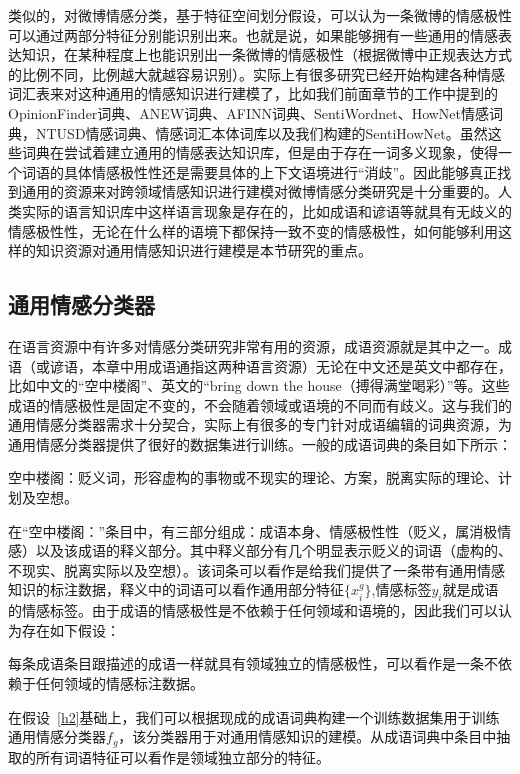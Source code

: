 类似的，对微博情感分类，基于特征空间划分假设，可以认为一条微博的情感极性可以通过两部分特征分别能识别出来。也就是说，如果能够拥有一些通用的情感表达知识，在某种程度上也能识别出一条微博的情感极性（根据微博中正规表达方式的比例不同，比例越大就越容易识别）。实际上有很多研究已经开始构建各种情感词汇表来对这种通用的情感知识进行建模了，比如我们前面章节的工作中提到的OpinionFinder词典、ANEW词典、AFINN词典、SentiWordnet、HowNet情感词典，NTUSD情感词典、情感词汇本体词库以及我们构建的SentiHowNet。虽然这些词典在尝试着建立通用的情感表达知识库，但是由于存在一词多义现象，使得一个词语的具体情感极性性还是需要具体的上下文语境进行“消歧”。因此能够真正找到通用的资源来对跨领域情感知识进行建模对微博情感分类研究是十分重要的。人类实际的语言知识库中这样语言现象是存在的，比如成语和谚语等就具有无歧义的情感极性性，无论在什么样的语境下都保持一致不变的情感极性，如何能够利用这样的知识资源对通用情感知识进行建模是本节研究的重点。

\subsection{通用情感分类器}
\label{general}
在语言资源中有许多对情感分类研究非常有用的资源，成语资源就是其中之一。成语（或谚语，本章中用成语通指这两种语言资源）无论在中文还是英文中都存在，比如中文的“空中楼阁”、英文的“bring down the house（搏得满堂喝彩）”等。这些成语的情感极性是固定不变的，不会随着领域或语境的不同而有歧义。这与我们的通用情感分类器需求十分契合，实际上有很多的专门针对成语编辑的词典资源，为通用情感分类器提供了很好的数据集进行训练。一般的成语词典的条目如下所示：
\begin{description}
\item{空中楼阁}：贬义词，形容虚构的事物或不现实的理论、方案，脱离实际的理论、计划及空想。
\end{description}
在“空中楼阁：”条目中，有三部分组成：成语本身、情感极性性（贬义，属消极情感）以及该成语的释义部分。其中释义部分有几个明显表示贬义的词语（虚构的、不现实、脱离实际以及空想）。该词条可以看作是给我们提供了一条带有通用情感知识的标注数据，释义中的词语可以看作通用部分特征$\{x_i^g\}$,情感标签$y_i$就是成语的情感标签。由于成语的情感极性是不依赖于任何领域和语境的，因此我们可以认为存在如下假设：

\begin{hypothesis}[条目情感极性假设]
\label{h2}
每条成语条目跟描述的成语一样就具有领域独立的情感极性，可以看作是一条不依赖于任何领域的情感标注数据。
\end{hypothesis}
在假设~\ref{h2}基础上，我们可以根据现成的成语词典构建一个训练数据集用于训练通用情感分类器$f_g$，该分类器用于对通用情感知识的建模。从成语词典中条目中抽取的所有词语特征可以看作是领域独立部分的特征。

